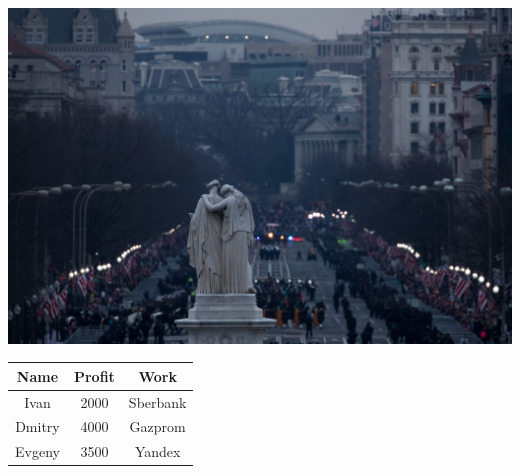 \documentclass{article}
\begin{document}
\includegraphics[width=\textwidth]{./images/superJumbo.jpg}

\begin{center}
\begin{tabular}{ |c|c|c| } 
 \hline
 Name & Profit & Work \\
 \hline
 Ivan & 2000 & Sberbank \\
 \hline
 Dmitry & 4000 & Gazprom \\
 \hline
 Evgeny & 3500 & Yandex \\
 \hline
\end{tabular}
\end{center}
\end{document}
